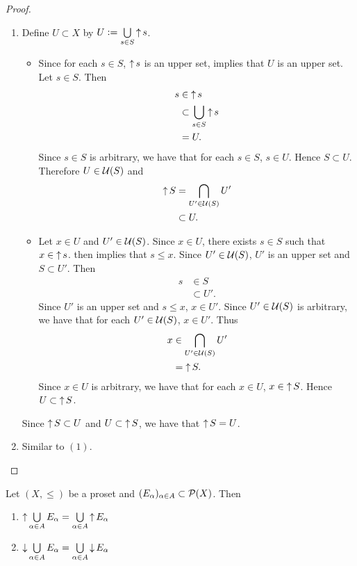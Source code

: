 \documentclass{book}
\begin{document}
	\begin{proof}\
		\begin{enumerate}
			\item Define $U \subset X$ by $U \vcentcolon= \bigcup\limits_{s \in S} \operatorname{\uparrow} s$.
			\begin{itemize}
				\item Since for each $s \in S$, $\operatorname{\uparrow} s$ is an upper set,  implies that $U$ is an upper set. Let $s \in S$. Then 
				\begin{align*}
					s 
					& \in \operatorname{\uparrow} s \\
					& \subset \bigcup\limits_{s \in S} \operatorname{\uparrow} s \\
					& = U.
				\end{align*}
				Since $s \in S$ is arbitrary, we have that for each $s \in S$, $s \in U$. Hence $S \subset U$. Therefore $U \in \mathcal{U}(S)$ and 
				\begin{align*}
					\operatorname{\uparrow} S
					& = \bigcap\limits_{U' \in \mathcal{U}(S)} U' \\
					& \subset U.
				\end{align*}
				\item Let $x \in U$ and $U' \in \mathcal{U}(S)$. Since $x \in U$, there exists $s \in S$ such that $x \in \operatorname{\uparrow} s$.  then implies that $s \leq x$. Since $U' \in \mathcal{U}(S)$, $U'$ is an upper set and $S \subset U'$. Then
				\begin{align*}
					s
					& \in S \\
					& \subset U'.
				\end{align*}
				Since $U'$ is an upper set and $s \leq x$, $x \in U'$. Since $U' \in \mathcal{U}(S)$ is arbitrary, we have that for each $U' \in \mathcal{U}(S)$, $x \in U'$. Thus 
				\begin{align*}
					x
					& \in \bigcap\limits_{U' \in \mathcal{U}(S)} U' \\
					& = \operatorname{\uparrow} S.
				\end{align*}
				Since $x \in U$ is arbitrary, we have that for each $x \in U$, $x \in \operatorname{\uparrow} S$. Hence $U \subset \operatorname{\uparrow} S$.
			\end{itemize}
			Since $\operatorname{\uparrow} S \subset U$ and $U \subset \operatorname{\uparrow} S$, we have that $\operatorname{\uparrow} S = U$.
			\item Similar to $(1)$.
		\end{enumerate}
	\end{proof}
	
	\begin{ex} 
		Let $(X, \leq)$ be a proset and $(E_{\alpha})_{\alpha \in A} \subset \mathcal{P}(X)$. Then 
		\begin{enumerate}
			\item $\operatorname{\uparrow} \bigcup\limits_{\alpha \in A} E_{\alpha} = \bigcup\limits_{\alpha \in A} \operatorname{\uparrow} E_{\alpha}$
			\item $\operatorname{\downarrow} \bigcup\limits_{\alpha \in A} E_{\alpha} = \bigcup\limits_{\alpha \in A} \operatorname{\downarrow} E_{\alpha}$
		\end{enumerate}
	\end{ex}
	
\end{document}
